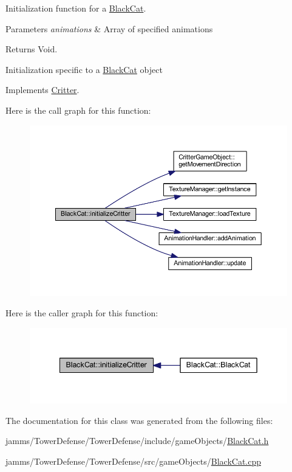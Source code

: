 Initialization function for a \hyperlink{class_black_cat}{Black\+Cat}. 


\begin{DoxyParams}{Parameters}
{\em animations} & Array of specified animations \\
\hline
\end{DoxyParams}
\begin{DoxyReturn}{Returns}
Void.
\end{DoxyReturn}
Initialization specific to a \hyperlink{class_black_cat}{Black\+Cat} object 

Implements \hyperlink{class_critter_ad425da71f01445ee175e5f98d94ca0ba}{Critter}.



Here is the call graph for this function\+:
\nopagebreak
\begin{figure}[H]
\begin{center}
\leavevmode
\includegraphics[width=350pt]{class_black_cat_a2ae946e05f754f7d7bdbc753946425eb_cgraph}
\end{center}
\end{figure}




Here is the caller graph for this function\+:\nopagebreak
\begin{figure}[H]
\begin{center}
\leavevmode
\includegraphics[width=342pt]{class_black_cat_a2ae946e05f754f7d7bdbc753946425eb_icgraph}
\end{center}
\end{figure}




The documentation for this class was generated from the following files\+:\begin{DoxyCompactItemize}
\item 
jamms/\+Tower\+Defense/\+Tower\+Defense/include/game\+Objects/\hyperlink{_black_cat_8h}{Black\+Cat.\+h}\item 
jamms/\+Tower\+Defense/\+Tower\+Defense/src/game\+Objects/\hyperlink{_black_cat_8cpp}{Black\+Cat.\+cpp}\end{DoxyCompactItemize}
